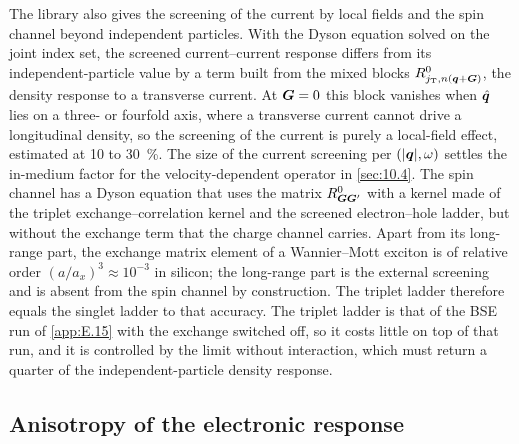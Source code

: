 The library also gives the screening of the current by local fields and the spin channel beyond independent particles. With the Dyson equation solved on the joint index set, the screened current--current response differs from its independent-particle value by a term built from the mixed blocks $R^0_{j_{\mathrm{T}},n(\bm{q}+\bm{G})}$, the density response to a transverse current. At $\bm{G} = 0$ this block vanishes when $\hat{\bm{q}}$ lies on a three- or fourfold axis, where a transverse current cannot drive a longitudinal density, so the screening of the current is purely a local-field effect, estimated at 10 to \SI{30}{\percent}. The size of the current screening per $(|\bm{q}|,\omega)$ settles the in-medium factor for the velocity-dependent operator in \cref{sec:10.4}. The spin channel has a Dyson equation that uses the matrix $R^0_{\bm{G}\bm{G}'}$ with a kernel made of the triplet exchange--correlation kernel and the screened electron--hole ladder, but without the exchange term that the charge channel carries. Apart from its long-range part, the exchange matrix element of a Wannier--Mott exciton is of relative order $(a/a_x)^3 \approx 10^{-3}$ in silicon; the long-range part is the external screening and is absent from the spin channel by construction. The triplet ladder therefore equals the singlet ladder to that accuracy. The triplet ladder is that of the BSE run of \cref{app:E.15} with the exchange switched off, so it costs little on top of that run, and it is controlled by the limit without interaction, which must return a quarter of the independent-particle density response.

\subsection{Anisotropy of the electronic response}


